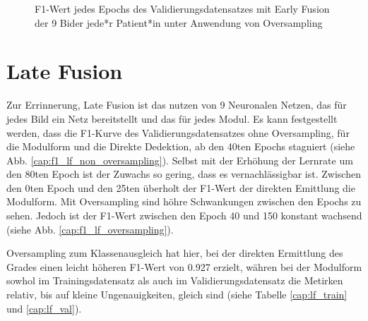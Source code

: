 \begin{figure}[b]\centering
\makebox[0pt]{}
\caption[F1-Wert jedes Epochs des Validierungsdatensatzes mit Early Fusion unter Anwendung von Oversampling]{F1-Wert jedes Epochs des Validierungsdatensatzes mit Early Fusion der 9 Bider jede*r Patient*in unter Anwendung von Oversampling}\label{cap:f1_ef_oversampling}
\end{figure}\label{fig:f1_ef_oversampling}

\clearpage
\section{Late Fusion}\label{latefusion}

Zur Errinnerung, Late Fusion ist das nutzen von 9 Neuronalen Netzen, das für jedes Bild ein Netz bereitstellt und das für jedes Modul.
Es kann festgestellt werden, dass die F1-Kurve des Validierungsdatensatzes ohne Oversampling, für die Modulform und die Direkte Dedektion, ab den 40ten Epochs stagniert (siehe Abb. \ref{cap:f1_lf_non_oversampling}). Selbst mit der Erhöhung der Lernrate um den 80ten Epoch ist der Zuwachs so gering, dass es vernachlässigbar ist. Zwischen den 0ten Epoch und den 25ten überholt der F1-Wert der direkten Emittlung die Modulform. Mit Oversampling sind höhre Schwankungen zwischen den Epochs zu sehen. Jedoch ist der F1-Wert zwischen den Epoch 40 und 150 konstant wachsend (siehe Abb. \ref{cap:f1_lf_oversampling}).

Oversampling zum Klassenausgleich hat hier, bei der direkten Ermittlung des Grades einen leicht höheren F1-Wert von 0.927 erzielt, währen bei der Modulform sowhol im Trainingsdatensatz als auch im Validierungsdatensatz die Metirken relativ, bis auf kleine Ungenauigkeiten, gleich sind (siehe Tabelle \ref{cap:lf_train} und \ref{cap:lf_val}).

